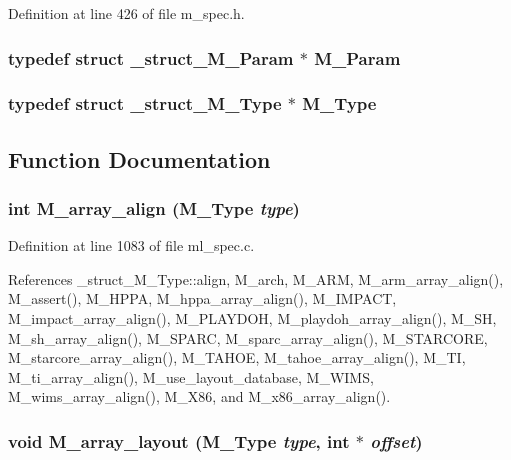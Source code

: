 Definition at line 426 of file m\_\-spec.h.
\subsubsection{\setlength{\rightskip}{0pt plus 5cm}typedef struct \bf{\_\-struct\_\-M\_\-Param} $\ast$ \bf{M\_\-Param}}\label{m__spec_8h_bc467fb7d4bce7c85f9a181462687abf}


\subsubsection{\setlength{\rightskip}{0pt plus 5cm}typedef struct \bf{\_\-struct\_\-M\_\-Type} $\ast$ \bf{M\_\-Type}}\label{m__spec_8h_679545670c34b30144e028e317d0f08a}




\subsection{Function Documentation}
\subsubsection{\setlength{\rightskip}{0pt plus 5cm}int M\_\-array\_\-align (\bf{M\_\-Type} {\em type})}\label{m__spec_8h_6fefcf5f802153eb7f0249f69485de0c}




Definition at line 1083 of file ml\_\-spec.c.

References \_\-struct\_\-M\_\-Type::align, M\_\-arch, M\_\-ARM, M\_\-arm\_\-array\_\-align(), M\_\-assert(), M\_\-HPPA, M\_\-hppa\_\-array\_\-align(), M\_\-IMPACT, M\_\-impact\_\-array\_\-align(), M\_\-PLAYDOH, M\_\-playdoh\_\-array\_\-align(), M\_\-SH, M\_\-sh\_\-array\_\-align(), M\_\-SPARC, M\_\-sparc\_\-array\_\-align(), M\_\-STARCORE, M\_\-starcore\_\-array\_\-align(), M\_\-TAHOE, M\_\-tahoe\_\-array\_\-align(), M\_\-TI, M\_\-ti\_\-array\_\-align(), M\_\-use\_\-layout\_\-database, M\_\-WIMS, M\_\-wims\_\-array\_\-align(), M\_\-X86, and M\_\-x86\_\-array\_\-align().
\subsubsection{\setlength{\rightskip}{0pt plus 5cm}void M\_\-array\_\-layout (\bf{M\_\-Type} {\em type}, int $\ast$ {\em offset})}\label{m__spec_8h_2002127b5a95a8db3fdfc991c73ef83a}





